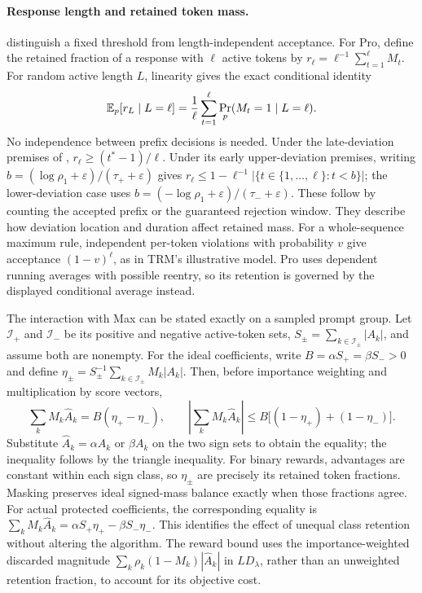 \paragraph{Response length and retained token mass.}
\citet[Appendix, Length-Neutral Trust Region Masking]{li2025trm}
distinguish a fixed threshold from length-independent acceptance. For Pro,
define the retained fraction of a response with $\ell$ active tokens by
$r_\ell=\ell^{-1}\sum_{t=1}^{\ell}M_t$. For random active length $L$,
linearity gives the exact conditional identity
\[
 \mathbb{E}_p[r_L\mid L=\ell]
 =\frac1\ell\sum_{t=1}^{\ell}\Pr_p(M_t=1\mid L=\ell).
\]
No independence between prefix decisions is needed. Under the late-deviation
premises of , $r_\ell\ge(t^*-1)/\ell$.
Under its early upper-deviation premises, writing
$b=(\log\rho_1+\varepsilon)/(\tau_++\varepsilon)$ gives
$r_\ell\le1-\ell^{-1}|\{t\in\{1,\ldots,\ell\}:t<b\}|$;
the lower-deviation case uses $b=(-\log\rho_1+\varepsilon)/(\tau_-+\varepsilon)$.
These follow by counting the accepted prefix or the guaranteed rejection
window. They describe how deviation location and duration affect retained
mass. For a whole-sequence maximum rule, independent per-token violations
with probability $v$ give acceptance $(1-v)^\ell$, as in TRM's illustrative
model. Pro uses dependent running averages with possible reentry, so its
retention is governed by the displayed conditional average instead.

The interaction with Max can be stated exactly on a sampled prompt group.
Let $\mathcal I_+$ and $\mathcal I_-$ be its positive and negative active-token
sets, $S_\pm=\sum_{k\in\mathcal I_\pm}|A_k|$, and assume both are nonempty.
For the ideal coefficients, write $B=\alpha S_+=\beta S_->0$ and define
$\eta_\pm=S_\pm^{-1}\sum_{k\in\mathcal I_\pm}M_k|A_k|$.
Then, before importance weighting and multiplication by score vectors,
\begin{equation}
 \sum_k M_k\hat A_k=B(\eta_+-\eta_-),\qquad
 \left|\sum_kM_k\hat A_k\right|
 \le B\bigl[(1-\eta_+)+(1-\eta_-)\bigr].
 \label{eq:masked-sign-mass}
\end{equation}
Substitute $\hat A_k=\alpha A_k$ or $\beta A_k$ on the two sign sets to
obtain the equality; the inequality follows by the triangle inequality.
For binary rewards, advantages are constant within each sign class, so
$\eta_\pm$ are precisely its retained token fractions. Masking preserves
ideal signed-mass balance exactly when those fractions agree. For actual
protected coefficients, the corresponding equality is
$\sum_kM_k\hat A_k=\alpha S_+\eta_+-\beta S_-\eta_-$.
This identifies the effect of unequal class retention without altering the
algorithm. The reward bound uses the importance-weighted discarded magnitude
$\sum_k\rho_k(1-M_k)|\hat A_k|$ in $LD_\lambda$, rather than an unweighted
retention fraction, to account for its objective cost.

